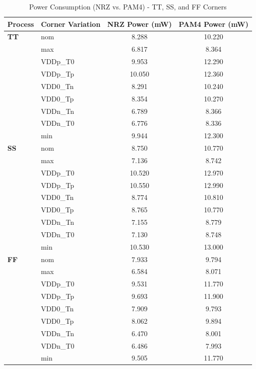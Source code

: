 \begin{table}[H]
    \centering
    \small
    \caption{Power Consumption (NRZ vs. PAM4) - TT, SS, and FF Corners}
    \label{tab:power_tt_ss_ff}
    \renewcommand{\arraystretch}{1.1}
    \begin{tabular}{llcc}
        \toprule
        \textbf{Process} & \textbf{Corner Variation} & \textbf{NRZ Power (mW)} & \textbf{PAM4 Power (mW)} \\
        \midrule
        \textbf{TT} & nom & 8.288 & 10.220 \\
                    & max & 6.817 & 8.364 \\
                    & VDDp\_T0 & 9.953 & 12.290 \\
                    & VDDp\_Tp & 10.050 & 12.360 \\
                    & VDD0\_Tn & 8.291 & 10.240 \\
                    & VDD0\_Tp & 8.354 & 10.270 \\
                    & VDDn\_Tn & 6.789 & 8.366 \\
                    & VDDn\_T0 & 6.776 & 8.336 \\
                    & min & 9.944 & 12.300 \\
        \midrule
        \textbf{SS} & nom & 8.750 & 10.770 \\
                    & max & 7.136 & 8.742 \\
                    & VDDp\_T0 & 10.520 & 12.970 \\
                    & VDDp\_Tp & 10.550 & 12.990 \\
                    & VDD0\_Tn & 8.774 & 10.810 \\
                    & VDD0\_Tp & 8.765 & 10.770 \\
                    & VDDn\_Tn & 7.155 & 8.779 \\
                    & VDDn\_T0 & 7.130 & 8.748 \\
                    & min & 10.530 & 13.000 \\
        \midrule
        \textbf{FF} & nom & 7.933 & 9.794 \\
                    & max & 6.584 & 8.071 \\
                    & VDDp\_T0 & 9.531 & 11.770 \\
                    & VDDp\_Tp & 9.693 & 11.900 \\
                    & VDD0\_Tn & 7.909 & 9.793 \\
                    & VDD0\_Tp & 8.062 & 9.894 \\
                    & VDDn\_Tn & 6.470 & 8.001 \\
                    & VDDn\_T0 & 6.486 & 7.993 \\
                    & min & 9.505 & 11.770 \\
        \bottomrule
    \end{tabular}
\end{table}

